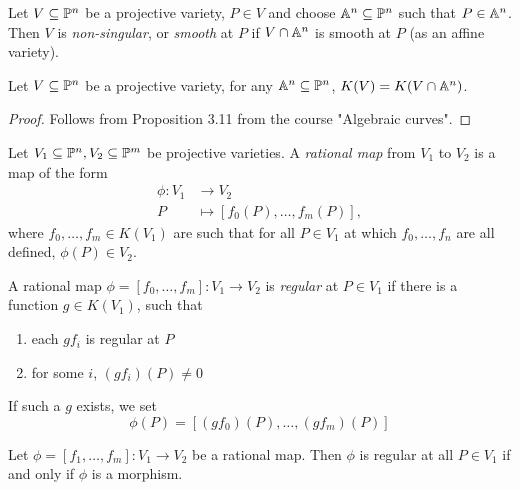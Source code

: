 \begin{definition}
	Let $V \subseteq \mathbb{P}^n$ be a projective variety,
	$P \in V$ and choose $\mathbb{A}^n \subseteq \mathbb{P}^n$ such
	that $P \in \mathbb{A}^n$. Then $V$ is \emph{non-singular}, or \emph{smooth}
	at $P$ if $V \cap \mathbb{A}^n$ is smooth at $P$ (as an affine variety).
\end{definition}

\begin{proposition}
	\label{prop:function-fields}
	Let $V \subseteq \mathbb{P}^n$ be a projective variety,
	for any $\mathbb{A}^n \subseteq \mathbb{P}^n$, $K(V) = K(V\cap \mathbb{A}^n)$.
\end{proposition}

\begin{proof}
	Follows from Proposition 3.11 from the course "Algebraic curves".
\end{proof}

\begin{definition}
	Let $V_1 \subseteq \mathbb{P}^n, V_2 \subseteq \mathbb{P}^m$ be projective varieties.
	A \emph{rational map} from $V_1$ to $V_2$ is a map of the form
	\begin{align*}
		\phi: V_1 &\to V_2\\
		P &\mapsto [f_0(P), \dots, f_m(P)],
	\end{align*}
	where $f_0, \dots, f_m \in K(V_1)$ are such that
	for all $P \in V_1$ at which $f_0, \dots, f_n$ are all defined, 
	$\phi(P) \in V_2$.
\end{definition}

\begin{definition}
	A rational map $\phi = [f_0, \dots, f_m]: V_1 \to V_2$
	is \emph{regular} at $P \in V_1$ if there is a function $g \in K(V_1)$,
	such that
	\begin{enumerate}[label=(\roman*)]
		\item each $gf_i$ is regular at $P$
		\item for some $i$, $(gf_i)(P) \neq 0$
	\end{enumerate}
	If such a $g$ exists, we set
	\begin{equation*}
		\phi(P) = [(gf_0)(P), \dots, (gf_m)(P)]
	\end{equation*}
\end{definition}

\begin{proposition}
	Let $\phi = [f_1, \dots, f_m]: V_1 \to V_2$ be a rational map. Then
	$\phi$ is regular at all $P \in V_1$ if and only if
	$\phi$ is a morphism.
\end{proposition}

